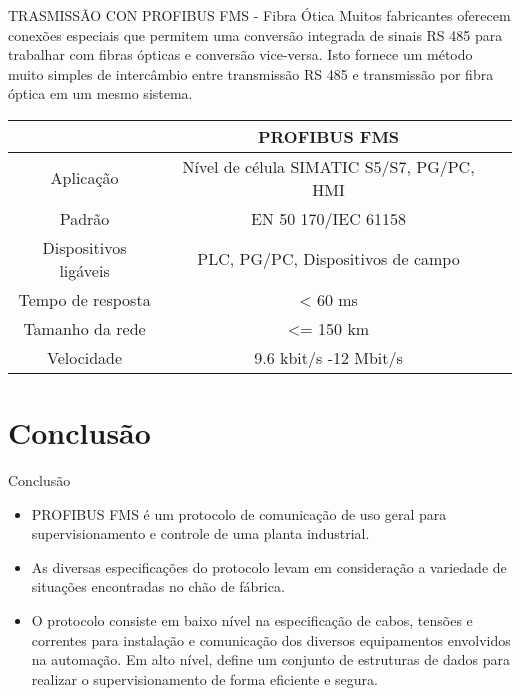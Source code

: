 \documentclass{beamer}
\begin{document}
\begin{frame}{TRASMISSÃO CON PROFIBUS FMS - Fibra Ótica}
Muitos fabricantes oferecem conexões especiais que permitem uma conversão integrada de sinais RS 485 para trabalhar com fibras ópticas e conversão vice-versa. Isto fornece um método muito simples de intercâmbio entre transmissão RS 485 e transmissão por fibra óptica em um mesmo sistema.

\begin{table}
\begin{tabular}{|c|c|c|} \hline
& PROFIBUS FMS \\ \hline
Aplicação & Nível de célula SIMATIC S5/S7, PG/PC, HMI \\ \hline
Padrão &  EN 50 170/IEC 61158 \\ \hline
Dispositivos ligáveis & PLC, PG/PC, Dispositivos de campo \\ \hline
Tempo de resposta &  < 60 ms \\ \hline
Tamanho da rede & <= 150 km \\ \hline
Velocidade & 9.6 kbit/s -12 Mbit/s \\ \hline
\end{tabular}
\end{table}

\end{frame}

\section{Conclusão}
\begin{frame}{Conclusão}
\begin{itemize}
\item PROFIBUS FMS é um protocolo de comunicação de uso geral para supervisionamento e
controle de uma planta industrial.
\item As diversas especificações do protocolo levam em consideração a variedade
de situações encontradas no chão de fábrica.
\item O protocolo consiste em baixo nível na especificação de cabos, tensões e correntes
para instalação e comunicação dos diversos equipamentos envolvidos na automação. Em alto nível, define um conjunto de estruturas de dados para realizar o supervisionamento de forma
eficiente e segura.
\end{itemize}

\end{frame}
\end{document}
